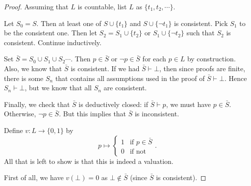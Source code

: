 \documentclass[a4paper]{article}
\begin{document}
\begin{proof}
  Assuming that $L$ is countable, list $L$ as $\{t_1, t_2, \cdots\}$.

  Let $S_0 = S$. Then at least one of $S\cup \{t_1\}$ and $S\cup \{\neg t_1\}$ is consistent. Pick $S_1$ to be the consistent one. Then let $S_2 = S_1 \cup \{t_2\}$ or $S_1\cup \{\neg t_2\}$ such that $S_2$ is consistent. Continue inductively.

  Set $\bar{S} = S_0\cup S_1\cup S_2\cdots$. Then $p\in \bar{S}$ or $\neg p\in \bar{S}$ for each $p\in L$ by construction. Also, we know that $\bar S$ is consistent. If we had $\bar S\vdash \bot$, then since proofs are finite, there is some $S_n$ that contains all assumptions used in the proof of $\bar S \vdash \bot$. Hence $S_n \vdash \bot$, but we know that all $S_n$ are consistent.

  Finally, we check that $\bar S$ is deductively closed: if $\bar S\vdash p$, we must have $p \in \bar S$. Otherwise, $\neg p\in \bar S$. But this implies that $\bar S$ is inconsistent.

  Define $v: L\to \{0, 1\}$ by
  \[
    p \mapsto
    \begin{cases}
      1 & \text{if }p\in \bar S\\
      0 & \text{if not}
    \end{cases}.
  \]
  All that is left to show is that this is indeed a valuation.

  First of all, we have $v(\bot) = 0$ as $\bot \not\in \bar S$ (since $\bar S$ is consistent).


\end{proof}
\end{document}
